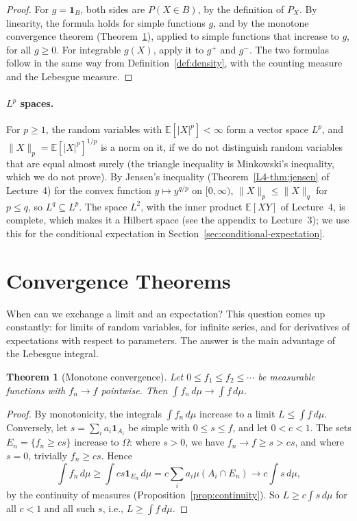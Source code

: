 \documentclass[11pt]{article}
\newcommand{\norm}[1]{\lVert #1 \rVert}
\newcommand{\E}{\mathbb{E}}
\theoremstyle{definition}
\theoremstyle{plain}
\newtheorem{theorem}[definition]{Theorem}
\theoremstyle{remark}
\begin{document}
\begin{proof}
    For $g = \mathbf{1}_B$, both sides are $P(X \in B)$, by the definition of $P_X$. By linearity, the formula holds for simple functions $g$, and by the monotone convergence theorem (Theorem~\ref{thm:monotone}), applied to simple functions that increase to $g$, for all $g \geq 0$. For integrable $g(X)$, apply it to $g^+$ and $g^-$. The two formulas follow in the same way from Definition~\ref{def:density}, with the counting measure and the Lebesgue measure.
\end{proof}

\paragraph{$L^p$ spaces.} For $p \geq 1$, the random variables with $\E[|X|^p] < \infty$ form a vector space $L^p$, and $\norm{X}_p = \E[|X|^p]^{1/p}$ is a norm on it, if we do not distinguish random variables that are equal almost surely (the triangle inequality is Minkowski's inequality, which we do not prove). By Jensen's inequality (Theorem~\ref{L4-thm:jensen} of Lecture~4) for the convex function $y \mapsto y^{q/p}$ on $[0, \infty)$, $\norm{X}_p \leq \norm{X}_q$ for $p \leq q$, so $L^q \subseteq L^p$. The space $L^2$, with the inner product $\E[XY]$ of Lecture~4, is complete, which makes it a Hilbert space (see the appendix to Lecture~3); we use this for the conditional expectation in Section~\ref{sec:conditional-expectation}.

\section{Convergence Theorems}\label{sec:convergence-theorems}

When can we exchange a limit and an expectation? This question comes up constantly: for limits of random variables, for infinite series, and for derivatives of expectations with respect to parameters. The answer is the main advantage of the Lebesgue integral.

\begin{theorem}[Monotone convergence]\label{thm:monotone}
    Let $0 \leq f_1 \leq f_2 \leq \cdots$ be measurable functions with $f_n \to f$ pointwise. Then $\int f_n\, d\mu \to \int f\, d\mu$.
\end{theorem}

\begin{proof}
    By monotonicity, the integrals $\int f_n\, d\mu$ increase to a limit $L \leq \int f\, d\mu$. Conversely, let $s = \sum_i a_i\mathbf{1}_{A_i}$ be simple with $0 \leq s \leq f$, and let $0 < c < 1$. The sets $E_n = \{f_n \geq cs\}$ increase to $\Omega$: where $s > 0$, we have $f_n \to f \geq s > cs$, and where $s = 0$, trivially $f_n \geq cs$. Hence
    \[\int f_n\, d\mu \geq \int cs\mathbf{1}_{E_n}\, d\mu = c\sum_i a_i\mu(A_i \cap E_n) \to c\int s\, d\mu,\]
    by the continuity of measures (Proposition~\ref{prop:continuity}). So $L \geq c\int s\, d\mu$ for all $c < 1$ and all such $s$, i.e., $L \geq \int f\, d\mu$.
\end{proof}
\end{document}
